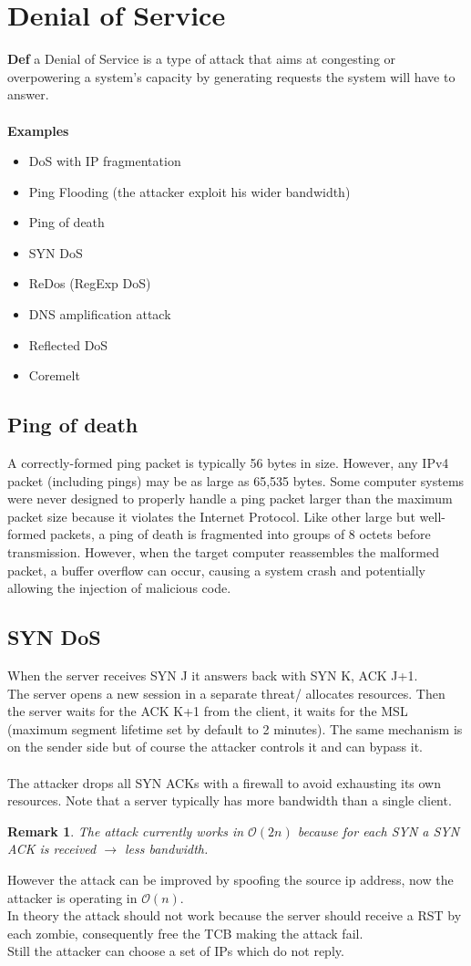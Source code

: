 \documentclass[10pt,a4paper]{book}
\newtheorem{remark}{Remark}
\begin{document}
\section{Denial of Service}
\textbf{Def} a Denial of Service is a type of attack that aims at congesting or overpowering a system's capacity by generating requests the system will have to answer.\\\\
\textbf{Examples}
\begin{itemize}
\item DoS with IP fragmentation
\item Ping Flooding (the attacker exploit his wider bandwidth)
\item Ping of death
\item SYN DoS
\item ReDos (RegExp DoS)
\item DNS amplification attack
\item Reflected DoS
\item Coremelt
\end{itemize}
\subsection{Ping of death}
A correctly-formed ping packet is typically 56 bytes in size. However, any IPv4 packet (including pings) may be as large as 65,535 bytes. Some computer systems were never designed to properly handle a ping packet larger than the maximum packet size because it violates the Internet Protocol. Like other large but well-formed packets, a ping of death is fragmented into groups of 8 octets before transmission. However, when the target computer reassembles the malformed packet, a buffer overflow can occur, causing a system crash and potentially allowing the injection of malicious code.
\subsection{SYN DoS}
When the server receives SYN J it answers back with SYN K, ACK J+1.\\
The server opens a new session in a separate threat/ allocates resources. Then the server waits for the ACK K+1 from the client, it waits for the MSL (maximum segment lifetime set by default to 2 minutes). The same mechanism is on the sender side but of course the attacker controls it and can bypass it.\\\\
The attacker drops all SYN ACKs with a firewall to avoid exhausting its own resources. Note that a server typically has more bandwidth than a single client.
\begin{remark}
The attack currently works in $\mathcal{O}(2n)$ because for each SYN a SYN ACK is received $\to$ less bandwidth.
\end{remark}
However the attack can be improved by spoofing the source ip address, now the attacker is operating in $\mathcal{O}(n)$.\\
In theory the attack should not work because the server should receive a RST by each zombie, consequently free the TCB making the attack fail.\\
Still the attacker can choose a set of IPs which do not reply.
\end{document}
